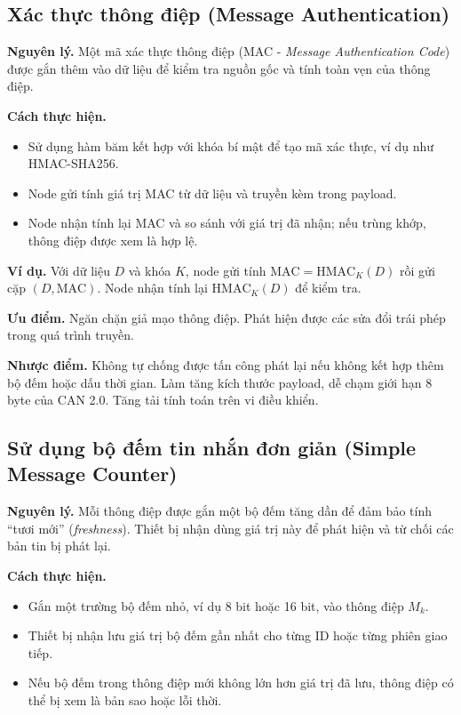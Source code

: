 \subsection{Xác thực thông điệp (Message Authentication)}
\textbf{Nguyên lý.} Một mã xác thực thông điệp (MAC - \textit{Message Authentication Code}) được gắn thêm vào dữ liệu để kiểm tra nguồn gốc và tính toàn vẹn của thông điệp.

\textbf{Cách thực hiện.}
\begin{itemize}[leftmargin=*]
    \item Sử dụng hàm băm kết hợp với khóa bí mật để tạo mã xác thực, ví dụ như HMAC-SHA256.
    \item Node gửi tính giá trị MAC từ dữ liệu và truyền kèm trong payload.
    \item Node nhận tính lại MAC và so sánh với giá trị đã nhận; nếu trùng khớp, thông điệp được xem là hợp lệ.
\end{itemize}

\textbf{Ví dụ.} Với dữ liệu $D$ và khóa $K$, node gửi tính $\text{MAC} = \text{HMAC}_{K}(D)$ rồi gửi cặp $(D, \text{MAC})$. Node nhận tính lại $\text{HMAC}_{K}(D)$ để kiểm tra.

\textbf{Ưu điểm.} Ngăn chặn giả mạo thông điệp. Phát hiện được các sửa đổi trái phép trong quá trình truyền.

\textbf{Nhược điểm.} Không tự chống được tấn công phát lại nếu không kết hợp thêm bộ đếm hoặc dấu thời gian. Làm tăng kích thước payload, dễ chạm giới hạn 8 byte của CAN 2.0. Tăng tải tính toán trên vi điều khiển.

\subsection{Sử dụng bộ đếm tin nhắn đơn giản (Simple Message Counter)}
\textbf{Nguyên lý.} Mỗi thông điệp được gắn một bộ đếm tăng dần để đảm bảo tính ``tươi mới'' (\textit{freshness}). Thiết bị nhận dùng giá trị này để phát hiện và từ chối các bản tin bị phát lại.

\textbf{Cách thực hiện.}
\begin{itemize}[leftmargin=*]
    \item Gắn một trường bộ đếm nhỏ, ví dụ 8 bit hoặc 16 bit, vào thông điệp $M_k$.
    \item Thiết bị nhận lưu giá trị bộ đếm gần nhất cho từng ID hoặc từng phiên giao tiếp.
    \item Nếu bộ đếm trong thông điệp mới không lớn hơn giá trị đã lưu, thông điệp có thể bị xem là bản sao hoặc lỗi thời.
\end{itemize}

